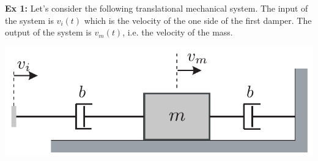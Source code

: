 \documentclass[twoside]{article}
\begin{document}
\textbf{Ex 1:} Let's consider the following translational mechanical system. The input of the system is $v_i(t)$ which is the velocity of the one side of
the first damper. The output of the system is $v_m(t)$, i.e. the velocity of the mass. 

  \begin{minipage}[h]{0.5\linewidth}
    \begin{center}
      \includegraphics[width=1\textwidth]{example}
    \end{center}
  \end{minipage}

  \vspace{6pt}
\end{document}
